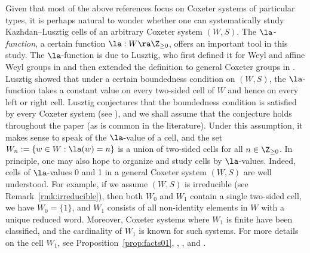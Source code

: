 Given that most of the above references focus on Coxeter systems of particular types, it is perhaps
natural to wonder whether one can systematically study Kazhdan--Lusztig cells of an arbitrary
Coxeter system $(W,S)$. The \emph{$\la$-function}, a certain function $\la: W\ra \Z_{\ge 0}$, offers
an important tool in this study.  The $\la$-function is due to Lusztig, who first defined it for
Weyl and affine Weyl groups in \cite{LusztigCellI, LusztigCellII} and then extended the definition
to general Coxeter groups in \cite{LusztigHecke}.  Lusztig showed that under a certain boundedness
condition on $(W,S)$, the $\la$-function takes a constant value on every two-sided cell of $W$ and
hence on every left or right cell. Lusztig conjectures that the boundedness condition is satisfied
by every Coxeter system (see \cite[\S13.4]{LusztigHecke}), and we shall assume that the conjecture
holds throughout the paper (as is common in the literature). Under this assumption, it makes sense
to speak of the $\la$-value of a cell, and the set $W_n:=\{w\in W:\la(w)=n\}$ is a union of
two-sided cells for all $n\in \Z_{\ge 0}$.  In principle, one may also hope to organize and study
cells by $\la$-values.  Indeed, cells of $\la$-values 0 and 1 in a general Coxeter system $(W,S)$
are well understood. For example, if we assume $(W,S)$ is {irreducible} (see
Remark~\ref{rmk:irreducible}), then both $W_0$ and $W_1$ contain a single two-sided cell, we have
$W_0=\{1\}$, and $W_1$ consists of all non-identity elements in $W$ with a unique reduced word.
Moreover, Coxeter systems where $W_1$ is finite have been classified, and the cardinality of $W_1$
is known for such systems. For more details on the cell $W_1$, see Proposition~\ref{prop:facts01},
\cite{LusztigSubregular}, \cite{Hart}, \cite[Chapter 13]{BonnafeCells} and \cite{XuSubregular}. 
